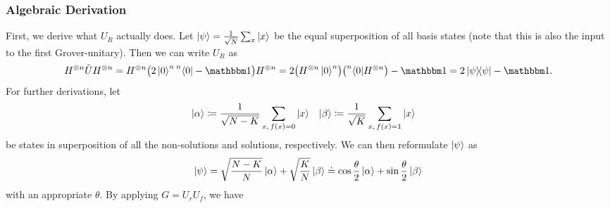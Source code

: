 			\subsubsection{Algebraic Derivation}
				First, we derive what \(U_R\) actually does. Let \( \ket{\psi} = \frac{1}{\sqrt{N}} \sum_x \ket{x} \) be the equal superposition of all basis states (note that this is also the input to the first Grover-unitary). Then we can write \(U_R\) as
				\begin{equation}
					H^{\otimes n} \tilde{U} H^{\otimes n}
					= H^{\otimes n} \bigl( 2 \ket{0}^n\prescript{n}{}{\bra{0}} - \ID \bigr) H^{\otimes n}
					= 2 \bigl( H^{\otimes n} \ket{0}^n \bigr) \bigl( \prescript{n}{}{\bra{0}} H^{\otimes n} \bigr) - \ID
					= 2 \ketbra{\psi}{\psi} - \ID.
				\end{equation}
				For further derivations, let
				\begin{align}
					\ket{\alpha} & \coloneqq \frac{1}{\sqrt{N - K}} \sum_{x,\, f(x) = 0} \ket{x} &
					\ket{\beta}  & \coloneqq \frac{1}{\sqrt{K}} \sum_{x,\, f(x) = 1} \ket{x}
				\end{align}
				be states in superposition of all the non-solutions and solutions, respectively. We can then reformulate \(\ket{\psi}\) as
				\begin{equation}
					\ket{\psi}
					= \sqrt{\frac{N - K}{N}} \ket{\alpha} + \sqrt{\frac{K}{N}} \ket{\beta}
					\doteq \cos\frac{\theta}{2} \ket{\alpha} + \sin\frac{\theta}{2} \ket{\beta}
				\end{equation}
				with an appropriate \(\theta\). By applying \( G = U_r U_f \), we have
